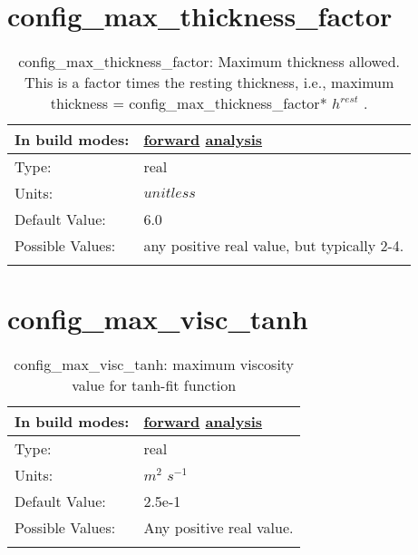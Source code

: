 \section[config\_max\_thickness\_factor]{config\_max\_thickness\_factor}
\label{sec:nm_sec_config_max_thickness_factor}
\begin{center}
\begin{longtable}{| p{2.0in} || p{4.0in} |}
    \hline
    In build modes: & \hyperref[subsec:forward_nm_tab_ALE_vertical_grid]{forward} \hyperref[subsec:analysis_nm_tab_ALE_vertical_grid]{analysis} \\
    \hline
    Type: & real \\
    \hline
    Units: & $unitless$ \\
    \hline
    Default Value: & 6.0 \\
    \hline
    Possible Values: & any positive real value, but typically 2-4. \\
    \hline
    \caption{config\_max\_thickness\_factor:  Maximum thickness allowed.  This is a factor times the resting thickness, i.e., maximum thickness = config\_max\_thickness\_factor* $h^{rest}$ .}
\end{longtable}
\end{center}
\section[config\_max\_visc\_tanh]{config\_max\_visc\_tanh}
\label{sec:nm_sec_config_max_visc_tanh}
\begin{center}
\begin{longtable}{| p{2.0in} || p{4.0in} |}
    \hline
    In build modes: & \hyperref[subsec:forward_nm_tab_vmix_tanh]{forward} \hyperref[subsec:analysis_nm_tab_vmix_tanh]{analysis} \\
    \hline
    Type: & real \\
    \hline
    Units: & $m^2$ $s^{-1}$ \\
    \hline
    Default Value: & 2.5e-1 \\
    \hline
    Possible Values: & Any positive real value. \\
    \hline
    \caption{config\_max\_visc\_tanh: maximum viscosity value for tanh-fit function}
\end{longtable}
\end{center}
